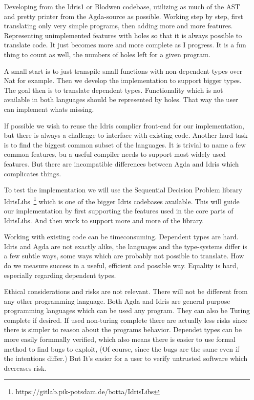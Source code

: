 \documentclass{scrartcl}
\begin{document}
Developing from the Idris1 or Blodwen codebase, utilizing as much of the AST
and pretty printer from the Agda-source as possible.
Working step by step, first translating only very simple programs, then adding
more and more features. Representing unimplemented features with holes so that
it is always possible to translate code. It just becomes more and more complete
as I progress. It is a fun thing to count as well, the numbers of holes left
for a given program.

A small start is to just transpile small functions with non-dependent types
over Nat for example. Then we develop the implementation to support bigger
types. The goal then is to translate dependent types.  Functionality which is
not available in both languages should be represented by holes. That way the
user can implement whats missing.

If possible we wish to reuse the Idris complier front-end for our
implementation, but there is always a challenge to interface with existing
code.  Another hard task is to find the biggest common subset of the languages.
It is trivial to name a few common features, bu a useful compiler needs to
support most widely used features. But there are incompatible differences
between Agda and Idris which complicates things.

To test the implementation we will use the Sequential Decision Problem library
IdrisLibs~\footnote{https://gitlab.pik-potsdam.de/botta/IdrisLibs} which is one
of the bigger Idris codebases available. This will guide our implementation by
first supporting the features used in the core parts of IdrisLibs. And then
work to support more and more of the library.



Working with existing code can be timeconsuming. Dependent types are hard.
Idris and Agda are not exactly alike, the languages and the type-systems differ
is a few subtle ways, some ways which are probably not possible to translate.
How do we measure success in a useful, efficient and possible way. Equality is
hard, especially regarding dependent types.

Ethical considerations and risks are not relevant. There will not be different
from any other programming language. Both Agda and Idris are general purpose
programming languages which can be used any program. They can also be Turing
complete if desired. If used non-turing complete there are actually less risks
since there is simpler to reason about the programs behavior. Dependet types
can be more easily formmally verified, which also means there is easier to use
formal method to find bugs to exploit, (Of course, since the bugs are the same
even if the intentions differ.) But It's easier for a user to verify untrusted
software which decreases risk.
\end{document}
